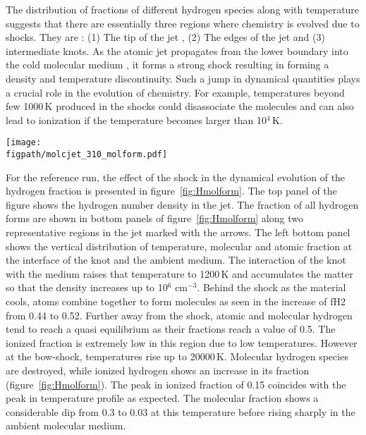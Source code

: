 \documentclass[useAMS,usenatbib]{mn2e}
\newcommand{\figpath}{/Users/bhargavvaidya/MyProject/work/Leeds_Uni/SiOJets_New/PAPER/PFIGS/}
\begin{document}


The distribution of fractions of different hydrogen species along with
temperature suggests that there are essentially three regions where
chemistry is evolved due to shocks.
They are : (1) The tip of the jet , (2) The edges of the jet and
(3) intermediate knots. As the atomic jet propagates from the lower boundary 
into the cold molecular medium , it forms a strong shock resulting in
forming a density and temperature discontinuity. Such a jump in
dynamical quantities plays a crucial role in the evolution of
chemistry. For example, temperatures beyond few 1000\,K produced in the shocks could
disassociate the molecules and can also lead to ionization if
the temperature becomes larger than 10$^{4}$\,K.
%
\begin{figure*}
 \texttt{[image: \\figpath/molcjet\_310\_molform.pdf]}
 \caption{Dependence of hydrogen fractions on the temperature at two
   points in the flow, viz. the interface of the knot with molecular
   medium and at the bow shock.}
\label{fig:Hmolform}
\end{figure*}

For the reference run, the effect of the shock in the dynamical evolution of
the hydrogen fraction is presented in figure~\ref{fig:Hmolform}. The top
panel of the figure shows the hydrogen number density in the jet. 
The fraction of all hydrogen forms are shown in bottom
panels of figure~\ref{fig:Hmolform} along two representative regions in
the jet marked with the arrows. The left bottom panel shows the
vertical distribution of temperature, molecular and atomic fraction at the
interface of the knot and the ambient medium. The interaction of the
knot with the medium raises that temperature to 1200\,K and
accumulates the matter so that the density increases up to
10$^{6}$ cm$^{-3}$. Behind the shock as the material cools, atoms
combine together to form molecules as seen in the increase of fH2 from
0.44 to 0.52. Further away from the
shock, atomic and molecular hydrogen tend to reach a quasi equilibrium as their
fractions reach a value of 0.5. The ionized fraction is
extremely low in this region due to low temperatures. However at the
bow-shock, temperatures rise up to 20000\,K. Molecular
hydrogen species are destroyed, while ionized hydrogen shows an
increase in its fraction 
(figure~\ref{fig:Hmolform}). The peak in ionized fraction of 0.15
coincides with the peak in temperature profile as expected. The
molecular fraction shows a considerable dip from 0.3 to 0.03 at 
this temperature before rising sharply in the ambient molecular
medium. 
%
\end{document}
